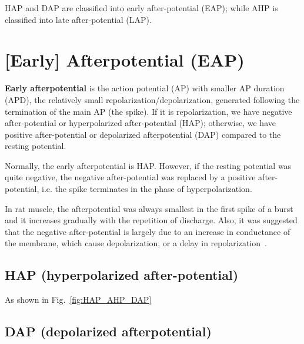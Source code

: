 HAP and DAP are classified into early after-potential (EAP); while AHP
is classified into late after-potential (LAP).

\section{[Early] Afterpotential (EAP)}
\label{sec:afterpotential}

{\bf Early afterpotential} is the action potential (AP) with smaller
AP duration (APD), the relatively small repolarization/depolarization,
generated following the termination of the main AP (the spike). If it
is repolarization, we have negative after-potential or hyperpolarized
after-potential (HAP); otherwise, we have positive after-potential or
depolarized afterpotential (DAP) compared to the resting potential.

Normally, the early afterpotential is HAP. However, if the resting
potential was quite negative, the negative after-potential was
replaced by a positive after-potential, i.e. the spike terminates in
the phase of hyperpolarization.

In rat muscle, the afterpotential was always smallest in the first
spike of a burst and it increases gradually with the repetition of
discharge. Also, it was suggested that the negative after-potential is
largely due to an increase in  conductance of the membrane,
which cause depolarization, or a delay in
repolarization~\citep{ohashi1970eci}.

\subsection{HAP (hyperpolarized after-potential)}
\label{sec:hap-hyperp-after}

As shown in Fig.~\ref{fig:HAP_AHP_DAP}

\subsection{DAP (depolarized afterpotential)}
\label{sec:dap-depol-afterp}

